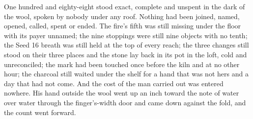 One hundred and eighty-eight stood exact, complete and unspent in the dark of the wool, spoken by nobody under any roof. Nothing had been joined, named, opened, called, spent or ended. The fire's fifth was still missing under the floor with its payer unnamed; the nine stoppings were still nine objects with no tenth; the Seed 16 breath was still held at the top of every reach; the three changes still stood on their three places and the stone lay back in its pot in the loft, cold and unreconciled; the mark had been touched once before the kiln and at no other hour; the charcoal still waited under the shelf for a hand that was not hers and a day that had not come. And the cost of the man carried out was entered nowhere. His hand outside the wool went up an inch toward the note of water over water through the finger's-width door and came down against the fold, and the count went forward.
